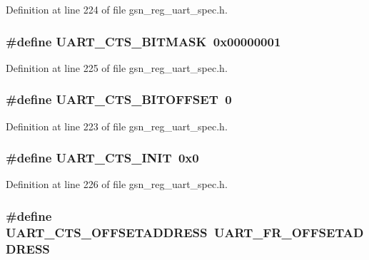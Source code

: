 Definition at line 224 of file gsn\_\-reg\_\-uart\_\-spec.h.

\hypertarget{a00575_aed80bfe6d93554e6b7cb1b837ef90609}{
\subsubsection[{UART\_\-CTS\_\-BITMASK}]{\setlength{\rightskip}{0pt plus 5cm}\#define UART\_\-CTS\_\-BITMASK~0x00000001}}
\label{a00575_aed80bfe6d93554e6b7cb1b837ef90609}


Definition at line 225 of file gsn\_\-reg\_\-uart\_\-spec.h.

\hypertarget{a00575_ae268aad023771a3288f193235c2f3301}{
\subsubsection[{UART\_\-CTS\_\-BITOFFSET}]{\setlength{\rightskip}{0pt plus 5cm}\#define UART\_\-CTS\_\-BITOFFSET~0}}
\label{a00575_ae268aad023771a3288f193235c2f3301}


Definition at line 223 of file gsn\_\-reg\_\-uart\_\-spec.h.

\hypertarget{a00575_ac849b8d30b41a0c713f60740140d3d6b}{
\subsubsection[{UART\_\-CTS\_\-INIT}]{\setlength{\rightskip}{0pt plus 5cm}\#define UART\_\-CTS\_\-INIT~0x0}}
\label{a00575_ac849b8d30b41a0c713f60740140d3d6b}


Definition at line 226 of file gsn\_\-reg\_\-uart\_\-spec.h.

\hypertarget{a00575_a4b94615376df71462116032aeff49634}{
\subsubsection[{UART\_\-CTS\_\-OFFSETADDRESS}]{\setlength{\rightskip}{0pt plus 5cm}\#define UART\_\-CTS\_\-OFFSETADDRESS~UART\_\-FR\_\-OFFSETADDRESS}}
\label{a00575_a4b94615376df71462116032aeff49634}


